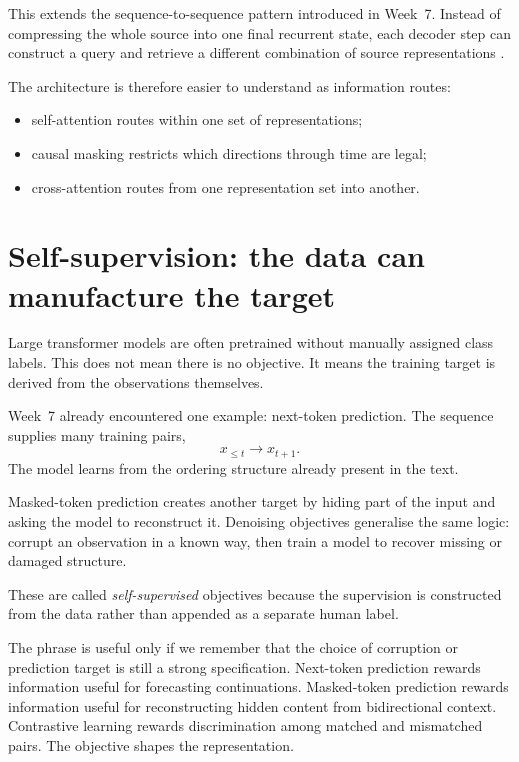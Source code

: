 This extends the sequence-to-sequence pattern introduced in Week~7. Instead of compressing the whole source into one final recurrent state, each decoder step can construct a query and retrieve a different combination of source representations \parencite{bahdanau2015,sutskever2014}.

The architecture is therefore easier to understand as information routes:
\begin{itemize}[leftmargin=*]
  \item self-attention routes within one set of representations;
  \item causal masking restricts which directions through time are legal;
  \item cross-attention routes from one representation set into another.
\end{itemize}

\section{Self-supervision: the data can manufacture the target}

Large transformer models are often pretrained without manually assigned class labels. This does not mean there is no objective. It means the training target is derived from the observations themselves.

Week~7 already encountered one example: next-token prediction. The sequence supplies many training pairs,
\[
  x_{\le t} \longrightarrow x_{t+1}.
\]
The model learns from the ordering structure already present in the text.

Masked-token prediction creates another target by hiding part of the input and asking the model to reconstruct it. Denoising objectives generalise the same logic: corrupt an observation in a known way, then train a model to recover missing or damaged structure.

These are called \emph{self-supervised} objectives because the supervision is constructed from the data rather than appended as a separate human label.

The phrase is useful only if we remember that the choice of corruption or prediction target is still a strong specification. Next-token prediction rewards information useful for forecasting continuations. Masked-token prediction rewards information useful for reconstructing hidden content from bidirectional context. Contrastive learning rewards discrimination among matched and mismatched pairs. The objective shapes the representation.

